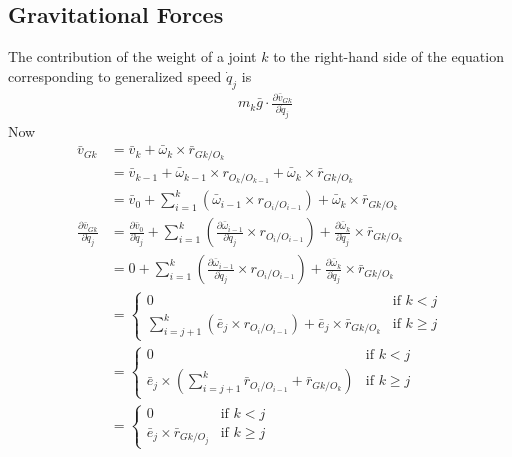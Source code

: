 \documentclass[a4paper,10pt]{article}
\begin{document}
\subsection{Gravitational Forces}
The contribution of the weight of a joint $k$ to the right-hand side of the equation corresponding to generalized speed
$\dot{q}_j$ is
\begin{align}
 &m_k\bar{g} \cdot \frac{\partial \bar{v}_{Gk}}{\partial \dot{q}_j} \label{gravity1}
\end{align}
Now
\begin{align}
 \bar{v}_{Gk} &= \bar{v}_k + \bar\omega_k \times \bar{r}_{Gk/O_k} \nonumber \\
 &= \bar{v}_{k-1} + \bar\omega_{k-1} \times r_{O_{k}/O_{k-1}} + \bar\omega_k \times \bar{r}_{Gk/O_k} \nonumber \\
 &= \bar{v}_0 + \sum\limits_{i=1}^{k} \left( \bar\omega_{i-1} \times r_{O_{i}/O_{i-1}} \right) + \bar\omega_k \times \bar{r}_{Gk/O_k}  \nonumber \\ 
 \frac{\partial \bar{v}_{Gk}}{\partial \dot{q}_j} &= \frac{\partial \bar{v}_0}{\partial \dot{q}_j} + \sum\limits_{i=1}^{k} \left( \frac{\partial \bar\omega_{i-1}}{\partial \dot{q}_j} \times r_{O_{i}/O_{i-1}} \right) + \frac{\partial \bar\omega_k}{\partial \dot{q}_j} \times \bar{r}_{Gk/O_k}  \nonumber \\ 
 &= 0 + \sum\limits_{i=1}^{k} \left( \frac{\partial \bar\omega_{i-1}}{\partial \dot{q}_j} \times r_{O_{i}/O_{i-1}} \right) + \frac{\partial \bar\omega_k}{\partial \dot{q}_j} \times \bar{r}_{Gk/O_k}  \nonumber \\
 &= \begin{cases}
     0 & \mbox{if } k < j \\
     \sum\limits_{i=j+1}^{k} \left( \bar{e}_j \times r_{O_{i}/O_{i-1}} \right) + \bar{e}_j \times \bar{r}_{Gk/O_k} & \mbox{if } k \geq j
    \end{cases} \nonumber \\
 &= \begin{cases}
     0 & \mbox{if } k < j \\
     \bar{e}_j \times \left( \sum\limits_{i=j+1}^{k} \bar{r}_{O_{i}/O_{i-1}} + \bar{r}_{Gk/O_k}\right) & \mbox{if } k \geq j
    \end{cases} \nonumber \\
 &= \begin{cases}
     0 & \mbox{if } k < j \\
     \bar{e}_j \times \bar{r}_{Gk/O_j} & \mbox{if } k \geq j
    \end{cases} 
\end{align}
\end{document}
